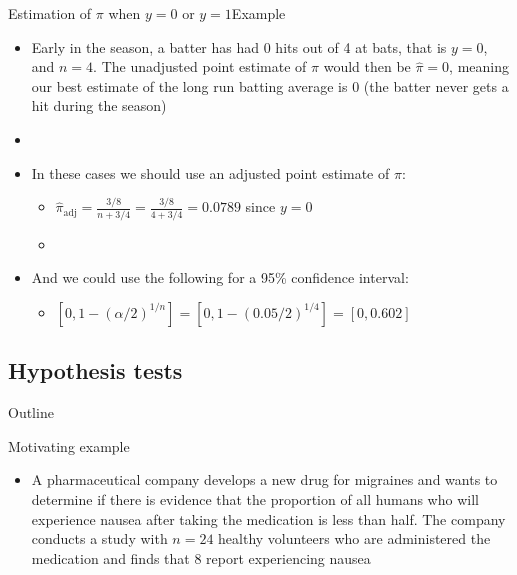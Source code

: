 \documentclass[xcolor=dvipsnames]{beamer}
\begin{document}
\begin{frame}{Estimation of $\pi$ when $y = 0$ or $y = 1$}{Example}
	\begin{itemize}
		\item Early in the season, a batter has had 0 hits out of 4 at bats, that is $y = 0$, and $n = 4$. The unadjusted point estimate of $\pi$ would then be $\hat{\pi} = 0$, meaning our best estimate of the long run batting average is 0 (the batter never gets a hit during the season)
		\item[]
		\item In these cases we should use an adjusted point estimate of $\pi$:
		\begin{itemize}
			\item $\hat{\pi}_{\text{adj}}= \frac{3/8}{n + 3/4} = \frac{3/8}{4 + 3/4} = 0.0789$ since $y = 0$
			\item[]
		\end{itemize}
		
		\item And we could use the following for a 95\% confidence interval:
		\begin{itemize}
			\item $\left[0, 1 - (\alpha / 2)^{1/n}\right] = \left[0, 1 - (0.05 / 2)^{1/4}\right] = [0, 0.602]$ 
		\end{itemize}
	\end{itemize}
\end{frame}

\subsection{Hypothesis tests}

\begin{frame}{Outline}
	\tableofcontents[currentsection,subsectionstyle=show/shaded/hide]
\end{frame}

\begin{frame}{Motivating example}
	\begin{itemize}
		\item A pharmaceutical company develops a new drug for migraines and wants to determine if there is evidence that the proportion of all humans who will experience nausea after taking the medication is less than half. The company conducts a study with $n = 24$ healthy volunteers who are administered the medication and finds that 8 report experiencing nausea
	\end{itemize}
\end{frame}
\end{document}
